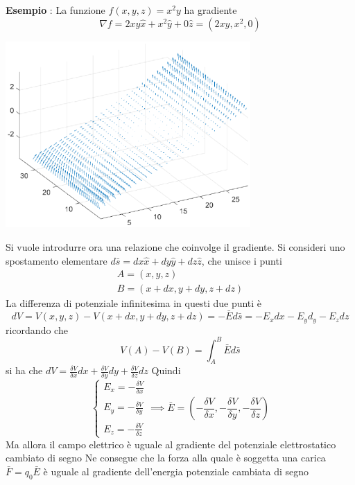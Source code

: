 \documentclass[10pt, letterpaper]{report}
\begin{document}
\textbf{Esempio} : La funzione $f(x,y,z)=x^2y$ ha gradiente 
$$ \nabla f = 2xy\hat x + x^2\hat y + 0\hat z = (2xy,x^2,0) $$
\begin{center}
    \includegraphics[width=0.7\textwidth]{images/grad.eps}
\end{center}
Si vuole introdurre ora una relazione che coinvolge il gradiente. Si consideri uno spostamento elementare $d\bar s = dx \hat x + dy\hat y +dz\hat z$, che unisce i punti 
$$\begin{matrix}
    A = (x,y,z)\\ 
    B= (x+dx,y+dy,z+dz)
\end{matrix}$$ 
La differenza di potenziale infinitesima in questi due punti è 
$$ dV=V(x,y,z)-V(x+dx,y+dy,z+dz)=-\bar E d\bar s = -E_x dx - E_y d_y - E_z dz$$
ricordando che 
$$ V(A)-V(B)=\int_A^B \bar E d\bar s$$ 
si ha che 
$dV=\frac{\delta V}{\delta x}dx+\frac{\delta V}{\delta y}dy+\frac{\delta V}{\delta z}dz$
Quindi 
$$ \begin{cases}
    E_x=-\displaystyle\frac{\delta V}{\delta x}\\  \\
    E_y=-\displaystyle\frac{\delta V}{\delta y}\\  \\
    E_z=-\displaystyle\frac{\delta V}{\delta z}
\end{cases}\implies \bar E = (-\frac{\delta V}{\delta x},-\frac{\delta V}{\delta y},-\frac{\delta V}{\delta z})$$
Ma allora il campo elettrico è uguale al gradiente del potenziale elettrostatico cambiato di segno
Ne consegue che la forza alla quale è soggetta una carica $\bar F = q_0\bar E$ è uguale al gradiente dell'energia potenziale cambiata di segno 
\end{document}
